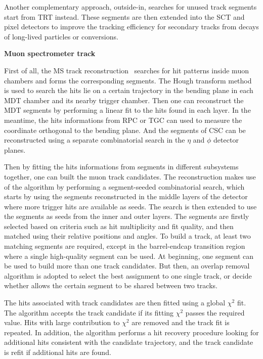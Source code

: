 Another complementary approach, outside-in, searches for unused track segments start from TRT instead.
These segments are then extended into the SCT and pixel detectors to improve the tracking efficiency for secondary tracks from decays of long-lived particles or conversions.

\textbf{Muon spectrometer track}

First of all, the MS track reconstruction~\cite{Aad:2016jkr} searches for hit patterns inside muon chambers and forms the corresponding segments.
The Hough transform method~\cite{ILLINGWORTH198887} is used to search the hits lie on a certain trajectory in the bending plane in each MDT chamber and its nearby trigger chamber.
Then one can reconstruct the MDT segments by performing a linear fit to the hits found in each layer.
In the meantime, the hits informations from RPC or TGC can used to measure the coordinate orthogonal to the bending plane.
And the segments of CSC can be reconstructed using a separate combinatorial search in the $\eta$ and $\phi$ detector planes.

Then by fitting the hits informations from segments in different subsystems together, one can built the muon track candidates.
The reconstruction makes use of the algorithm by performing a segment-seeded combinatorial search, which starts by using the segments reconstructed in the middle layers of the detector where more trigger hits are available as seeds.
The search is then extended to use the segments as seeds from the inner and outer layers.
The segments are firstly selected based on criteria such as hit multiplicity and fit quality, and then matched using their relative positions and angles.
To build a track, at least two matching segments are required, except in the barrel-endcap transition region where a single high-quality segment can be used.
At beginning, one segment can be used to build more than one track candidates.
But then, an overlap removal algorithm is adopted to select the best assignment to one single track, or decide whether allows the certain segment to be shared between two tracks.

The hits associated with track candidates are then fitted using a global $\chi^{2}$ fit.
The algorithm accepts the track candidate if its fitting $\chi^{2}$ passes the required value.
Hits with large contribution to $\chi^{2}$ are removed and the track fit is repeated.
In addition, the algorithm performs a hit recovery procedure looking for additional hits consistent with the candidate trajectory, and the track candidate is refit if additional hits are found.

